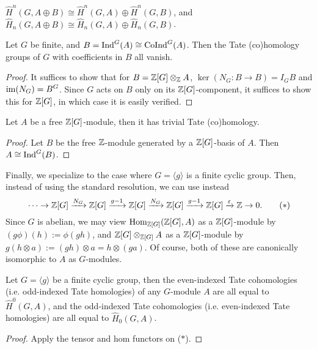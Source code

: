 \documentclass[11pt]{amsart}
\begin{document}
\begin{lem}
    $\hat{H}^n(G,A\oplus B) \cong \hat{H}^n(G,A)\oplus \hat{H}^n(G,B)$, and $\hat{H}_n(G,A\oplus B) \cong \hat{H}_n(G,A)\oplus \hat{H}_n(G,B)$.
\end{lem}

\begin{thm}
    Let $G$ be finite, and $B = \operatorname{Ind}^G(A) \cong \operatorname{CoInd}^G(A)$. Then the Tate (co)homology groups of $G$ with coefficients in $B$ all vanish.
\end{thm}

\begin{proof}
    It suffices to show that for $B = \mathbb{Z}[G]\otimes_{\mathbb{Z}} A$, $\ker(N_G: B\to B) = I_G B$ and $\operatorname{im}(N_G) = B^G$. Since $G$ acts on $B$ only on its $\mathbb{Z}[G]$-component, it suffices to show this for $\mathbb{Z}[G]$, in which case it is easily verified.
\end{proof}


\begin{cor}
    Let $A$ be a free $\mathbb{Z}[G]$-module, then it has trivial Tate (co)homology.
\end{cor}

\begin{proof}
    Let $B$ be the free $\mathbb{Z}$-module generated by a $\mathbb{Z}[G]$-basis of $A$. Then $A \cong \operatorname{Ind}^G(B)$.
\end{proof}

Finally, we specialize to the case where $G = \langle g\rangle$ is a finite cyclic group. Then, instead of using the standard resolution, we can use instead
\[\dots \to \mathbb{Z}[G] \xrightarrow{N_G} \mathbb{Z}[G] \xrightarrow{g-1} \mathbb{Z}[G] \xrightarrow{N_G} \mathbb{Z}[G] \xrightarrow{g-1} \mathbb{Z}[G] \xrightarrow{\varepsilon} \mathbb{Z}\to 0. \tag{$\ast$}\]
Since $G$ is abelian, we may view $\operatorname{Hom}_{\mathbb{Z}[G]}(\mathbb{Z}[G], A)$ as a $\mathbb{Z}[G]$-module by $(g\phi)(h) := \phi(gh)$, and $\mathbb{Z}[G]\otimes_{\mathbb{Z}[G]} A$ as a $\mathbb{Z}[G]$-module by $g(h\otimes a) := (gh)\otimes a = h\otimes (ga)$. Of course, both of these are canonically isomorphic to $A$ as $G$-modules.


\begin{thm}
    Let $G = \langle g\rangle$ be a finite cyclic group, then the even-indexed Tate cohomologies (i.e. odd-indexed Tate homologies) of any $G$-module $A$ are all equal to $\hat{H}^0(G,A)$, and the odd-indexed Tate cohomologies (i.e. even-indexed Tate homologies) are all equal to $\hat{H}_0(G,A)$.
\end{thm}

\begin{proof}
    Apply the tensor and hom functors on ($\ast$).
\end{proof}
\end{document}
